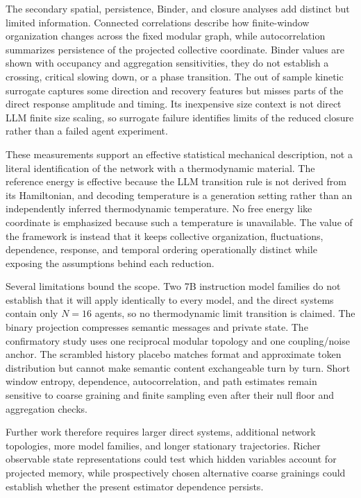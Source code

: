\documentclass[12pt]{article}
\begin{document}
The secondary spatial, persistence, Binder, and closure analyses add distinct
but limited information.  Connected correlations describe how finite-window
organization changes across the fixed modular graph, while autocorrelation
summarizes persistence of the projected collective coordinate.  Binder values
are shown with occupancy and aggregation sensitivities,  they do not establish
a crossing, critical slowing down, or a phase transition.  The out of sample
kinetic surrogate captures some direction and recovery features but misses
parts of the direct response amplitude and timing.  Its inexpensive size
context is not direct LLM finite size scaling, so surrogate failure identifies
limits of the reduced closure rather than a failed agent experiment.

These measurements support an effective statistical mechanical description,
not a literal identification of the network with a thermodynamic material.
The reference energy is effective because the LLM transition rule is not
derived from its Hamiltonian, and decoding temperature is a generation setting
rather than an independently inferred thermodynamic temperature.  No
free energy like coordinate is emphasized because such a temperature is
unavailable.  The value of the framework is instead that it keeps collective
organization, fluctuations, dependence, response, and temporal ordering
operationally distinct while exposing the assumptions behind each reduction.

Several limitations bound the scope.  Two 7B instruction model families do
not establish that it will apply identically to every model,
and the direct systems contain only $N=16$ agents,
so no thermodynamic limit transition is claimed.  The binary projection
compresses semantic messages and private state.  The confirmatory study uses
one reciprocal modular topology and one coupling/noise anchor.  The
scrambled history placebo matches format and approximate token distribution
but cannot make semantic content exchangeable turn by turn.  Short window
entropy, dependence, autocorrelation, and path estimates remain sensitive to
coarse graining and finite sampling even after their null floor and
aggregation checks.

Further work therefore requires larger direct systems, additional network
topologies, more model families, and longer stationary trajectories.  Richer
observable state representations could test which hidden variables account
for projected memory, while prospectively chosen alternative coarse grainings
could establish whether the present estimator dependence persists.
\end{document}
